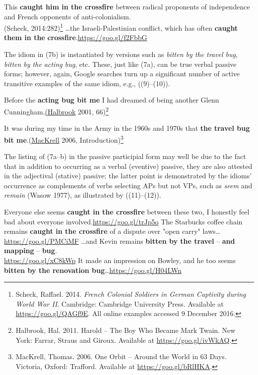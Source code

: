 \documentclass[output=paper,
modfonts
]{LSP/langsci}
\begin{document}
\ea
	\ea This \textbf{caught him in the crossfire} between radical
	proponents of independence and French opponents of anti-colonialism.\\
	\hfill (Scheck, 2014:282)\footnote{Scheck, Raffael. 2014. \emph{French Colonial
  	Soldiers in German Captivity during World War II}. Cambridge:
  	Cambridge University Press. Available at \url{https://goo.gl/QAGf9E}. All online examples 			accessed 9 December 2016.}
	\ex \ldots{}the Israeli-Palestinian conflict, which has often \textbf{caught them in the }
	\textbf{crossfire}.\hfill \url{https://goo.gl/f2FbbG}
	\z
\z

The idiom in (7b) is instantiated by versions such as \emph{bitten by
the travel bug}, \emph{bitten by the acting bug}, etc. These, just like
(7a), can be true verbal passive forms; however, again, Google searches
turn up a significant number of active transitive examples of the same
idiom, e.g., ((9)--(10)).

\ea 	Before the \textbf{acting bug bit me} I had dreamed of being another
	Glenn Cunningham.\hfill \href{https://books.google.co.il/books?isbn=1429969016}{(Halbrook} 			2001, 66)\footnote{Halbrook, Hal. 2011. Harold -- The Boy Who Became Mark Twain. New
 	York: Farrar, Straus and Giroux. Available at \url{https://goo.gl/ivWkAQ}.}
	
\ex It was during my time in the Army in the 1960s and 1970s that \textbf{the travel bug bit me}.\hfill (\href{https://books.google.co.il/books?isbn=1412078369}{MacKrell} 2006,
Introduction)\footnote{MacKrell, Thomas. 2006. One Orbit -- Around the
  World in 63 Days. Victoria, Oxford: Trafford. Available at
  \url{https://goo.gl/bRlHKA}.}
\z

The listing of (7a--b) in the passive participial form may well be due to
the fact that in addition to occurring as a verbal (eventive) passive,
they are also attested in the adjectival (stative) passive; the latter
point is demonstrated by the idioms' occurrence as complements of verbs
selecting APs but not VPs, such as \emph{seem} and \emph{remain} (Wasow
1977), as illustrated by ((11)--(12)).

\ea
	\ea Everyone else seems \textbf{caught in the crossfire} between these two, 
	I honestly feel bad about everyone involved.\hfill \url{https://goo.gl/trJp5o}
	\ex The Starbucks coffee chain remains \textbf{caught in the crossfire}
	of a dispute over "open carry" laws\ldots{}\hfill \url{https://goo.gl/PMCiMF}
	\z
\ex
	\ea \ldots{}and Kevin remains \textbf{bitten by the travel} -- \textbf{and}
	\textbf{mapping} -- \textbf{bug}.\\
	\hfill \url{https://goo.gl/xC8kWp}
	\ex It made an impression on Bowley, and he too seems \textbf{bitten by
	the renovation bug}\ldots{}\hfill \url{https://goo.gl/H04LWn}
	\z
\z
\end{document}

